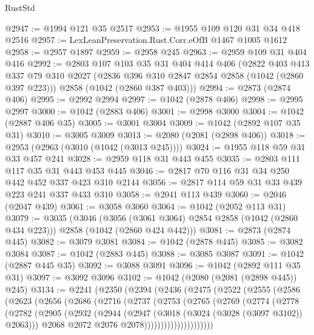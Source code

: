 \begin{lexlean}{RustStd}
\begin{coremodule}
@2947 := @1994 @121 @35 @2517
@2953 := @1955 @109 @120 @31 @34 @418 @2516
@2957 := LexLeanPreservation.Rust.Corr.eOfB @1467 @1005 @1612
@2958 := @2957 @1897
@2959 := @2958 @245
@2963 := @2959 @109 @31 @404 @416
@2992 := @2803
    @107
    @103
    @35
    @31
    @404
    @414
    @406
    (@2822
      @403
      @413
      @337
      @79
      @310
      @2027
      (@2836 @396 @310 @2847 @2854 @2858 (@1042 (@2860 @397 @223)))
      @2858
      (@1042 (@2860 @387 @403)))
@2994 := @2873 (@2874 @406)
@2995 := @2992 @2994
@2997 := @1042 (@2878 @406)
@2998 := @2995 @2997
@3000 := @1042 (@2883 @406)
@3001 := @2998 @3000
@3004 := @1042 (@2887 @406 @35)
@3005 := @3001 @3004
@3009 := @1042 (@2892 @107 @35 @31)
@3010 := @3005 @3009
@3013 := @2080 (@2081 (@2898 @406))
@3018 := @2953 (@2963 (@3010 (@1042 (@3013 @245))))
@3024 := @1955 @118 @59 @31 @33 @457 @241
@3028 := @2959 @118 @31 @443 @455
@3035 := @2803 @111 @117 @35 @31 @443 @453 @445
@3046 := @2817 @70 @116 @31 @34 @250 @442 @452 @337 @423 @310 @2144
@3056 := @2817 @114 @59 @31 @33 @439 @223 @241 @337 @433 @310
@3058 := @2041 @113 @439
@3060 := @2046 (@2047 @439)
@3061 := @3058 @3060
@3064 := @1042 (@2052 @113 @31)
@3079 := @3035
    (@3046
      (@3056 (@3061 @3064) @2854 @2858 (@1042 (@2860 @434 @223)))
      @2858
      (@1042 (@2860 @424 @442)))
@3081 := @2873 (@2874 @445)
@3082 := @3079 @3081
@3084 := @1042 (@2878 @445)
@3085 := @3082 @3084
@3087 := @1042 (@2883 @445)
@3088 := @3085 @3087
@3091 := @1042 (@2887 @445 @35)
@3092 := @3088 @3091
@3096 := @1042 (@2892 @111 @35 @31)
@3097 := @3092 @3096
@3102 := @1042 (@2080 (@2081 (@2898 @445)) @245)
@3134 := @2241
    (@2350
      (@2394
        (@2436
          (@2475
            (@2522
              (@2555
                (@2586
                  (@2623
                    (@2656
                      (@2686
                        (@2716
                          (@2737
                            (@2753
                              (@2765
                                (@2769
                                  (@2774
                                    (@2778
                                      (@2782
                                        (@2905
                                          (@2932
                                            (@2944
                                              (@2947 (@3018 (@3024 (@3028 (@3097 @3102)) @2063)))
                                              @2068
                                              @2072
                                              @2076
                                              @2078)))))))))))))))))))))

\end{coremodule}
\end{lexlean}

